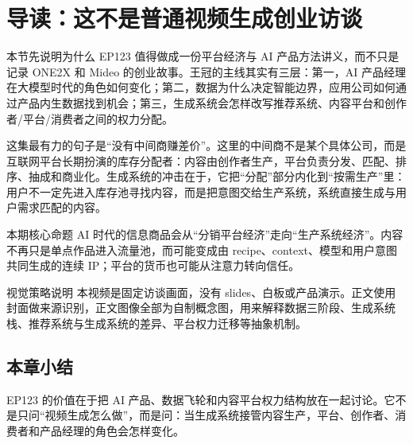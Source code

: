 \section{导读：这不是普通视频生成创业访谈}

本节先说明为什么 EP123 值得做成一份平台经济与 AI 产品方法讲义，而不只是记录 ONE2X 和 Mideo 的创业故事。王冠的主线其实有三层：第一，AI 产品经理在大模型时代的角色如何变化；第二，数据为什么决定智能边界，应用公司如何通过产品内生数据找到机会；第三，生成系统会怎样改写推荐系统、内容平台和创作者/平台/消费者之间的权力分配。

这集最有力的句子是“没有中间商赚差价”。这里的中间商不是某个具体公司，而是互联网平台长期扮演的库存分配者：内容由创作者生产，平台负责分发、匹配、排序、抽成和商业化。生成系统的冲击在于，它把“分配”部分内化到“按需生产”里：用户不一定先进入库存池寻找内容，而是把意图交给生产系统，系统直接生成与用户需求匹配的内容。

\begin{importantbox}{本期核心命题}
AI 时代的信息商品会从“分销平台经济”走向“生产系统经济”。内容不再只是单点作品进入流量池，而可能变成由 recipe、context、模型和用户意图共同生成的连续 IP；平台的货币也可能从注意力转向信任。
\end{importantbox}

\begin{knowledgebox}{视觉策略说明}
本视频是固定访谈画面，没有 slides、白板或产品演示。正文使用封面做来源识别，正文图像全部为自制概念图，用来解释数据三阶段、生成系统栈、推荐系统与生成系统的差异、平台权力迁移等抽象机制。
\end{knowledgebox}

\subsection{本章小结}

EP123 的价值在于把 AI 产品、数据飞轮和内容平台权力结构放在一起讨论。它不是只问“视频生成怎么做”，而是问：当生成系统接管内容生产，平台、创作者、消费者和产品经理的角色会怎样变化。

